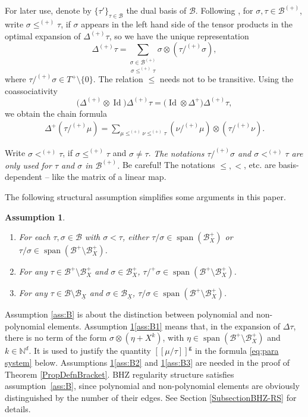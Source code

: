 \documentclass[11pt]{article}
\newcommand{\skpt}{\smallskip}
\numberwithin{equation}{section}
\DeclareMathOperator{\Span}{span}
\theoremstyle{plain}
\newtheorem{assumption}{Assumption}
\theoremstyle{definition}
\DeclareMathOperator{\iden}{Id}
\newcommand{\Brac}[1]{[\![#1]\!]}
\newcommand{\sfg}{\mathsf{g}}
\newcommand{\bbN}{\mathbb{N}}
\newcommand{\mcB}{\mathcal{B}}
\begin{document}
For later use, denote by $\{\tau'\}_{\tau\in\mcB}$ the dual basis of $\mcB$. Following \cite{BH}, for $\sigma,\tau\in\mcB^{(+)}$, write $\sigma\le^{(+)}\tau$, if $\sigma$ appears in the left hand side of the tensor products in the optimal expansion of $\Delta^{(+)}\tau$, so we have the unique representation
\[
\Delta^{(+)}\tau = \underset{\sigma\le^{(+)}\tau}{\sum_{\sigma\in\mcB^{(+)}}} \sigma\otimes(\tau/^{(+)}\sigma),
\]
where $\tau/^{(+)}\sigma\in T^+\setminus\{0\}$.
The relation $\le$ needs not to be transitive. Using the coassociativity
\[
\bigl(\Delta^{(+)}\otimes\iden \bigr)\Delta^{(+)}\tau = \bigl(\iden \otimes\Delta^+\bigr)\Delta^{(+)}\tau,
\]
we obtain the chain formula
\begin{align}\label{chain formula}
\Delta^{+}(\tau/^{(+)}\mu)=\sum_{\mu\le^{(+)}\nu\le^{(+)}\tau}(\nu/^{(+)}\mu)\otimes(\tau/^{(+)}\nu).
\end{align}

Write $\sigma<^{(+)}\tau$, if $\sigma\le^{(+)}\tau$ and $\sigma\neq\tau$.
{\it The notations $\tau/^{(+)}\sigma$ and $\sigma<^{(+)}\tau$ are only used for $\tau$ and $\sigma$ in $\mcB^{(+)}$.} Be careful! The notations $\leq, <$, etc. are basis-dependent -- like the matrix of a linear map.

The following structural assumption simplifies some arguments in this paper.

\skpt
\begin{assumption}\label{ass:B}
\begin{enumerate}
\item\label{ass:B1} For each $\tau,\sigma\in\mcB$ with $\sigma<\tau$, either $\tau/\sigma\in\Span (\mcB_X^+)$ or $\tau/\sigma\in\Span (\mcB^+\setminus\mcB_X^+)$.
\item\label{ass:B2} For any $\tau\in\mcB^+\setminus\mcB_X^+$ and $\sigma\in\mcB_X^+$, $\tau/^+\sigma\in\Span (\mcB^+\setminus\mcB_X^+)$.
\item\label{ass:B3} For any $\tau\in\mcB\setminus\mcB_{\underline{X}}$ and $\sigma\in\mcB_{\underline{X}}$, $\tau/\sigma\in\Span (\mcB^+\setminus\mcB_X^+)$.
\end{enumerate}
\end{assumption}

Assumption \eqref{ass:B} is about the distinction between polynomial and non-polynomial elements.
Assumption \ref{ass:B}\eqref{ass:B1} means that, in the expansion of $\Delta\tau$, there is no term of the form $\sigma\otimes (\eta+X^k)$, with $\eta\in\Span (\mcB^+\setminus\mcB_X^+)$ and $k\in\bbN^d$. It is used to justify the quantity $\Brac{\mu/\tau}^{\sfg}$ in the formula \eqref{eq:para system} below.
Assumptions \ref{ass:B}\eqref{ass:B2} and \ref{ass:B}\eqref{ass:B3} are needed in the proof of Theorem \ref{PropDefnBracket}.
BHZ regularity structure satisfies assumption~\eqref{ass:B}, since polynomial and non-polynomial elements are obviously distinguished by the number of their edges. See Section \ref{SubsectionBHZ-RS} for details.
\end{document}
